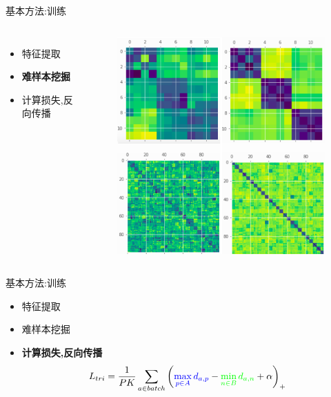 \documentclass[notes]{beamer}
\begin{document}
\begin{frame}
	{基本方法:训练}
	\begin{columns}
	\begin{itemize}
		\item 特征提取
		\item {\bf 难样本挖掘}
		\item 计算损失,反向传播
	\end{itemize}
	\begin{figure}
		\centering
		\includegraphics[width=\textwidth]{2018-03-12-14-59-27.png}
	\end{figure}
\end{columns} 

\end{frame}

\begin{frame}
	{基本方法:训练} 
	\begin{itemize}
		\item 特征提取
		\item 难样本挖掘
		\item {\bf 计算损失,反向传播}
		\begin{equation} 
			L_{tri}=\frac{1}{PK}\sum_{a \in batch} \left(
				 \textcolor{blue}{\max_{p \in A} d_{a,p}} - 
				  \textcolor{green}{\min_{n \in B} d_{a,n}} +\alpha \right)_+
		\end{equation}
	\end{itemize}
\end{frame}
\end{document}
